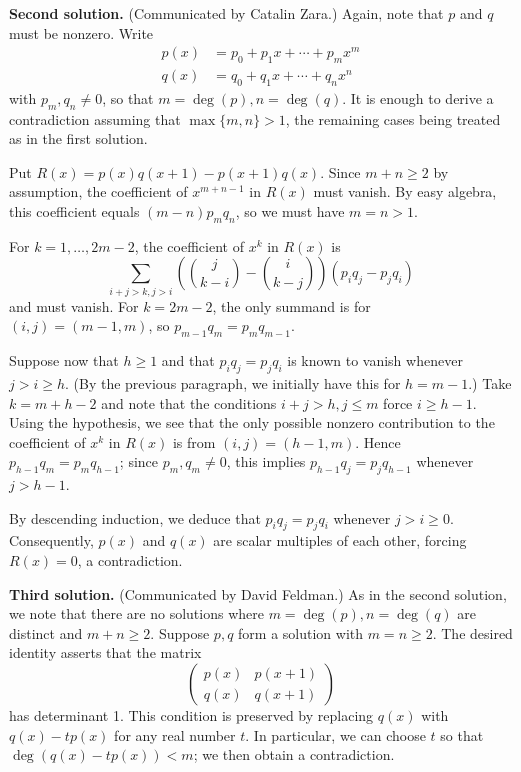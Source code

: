 \documentclass[amssymb,twocolumn,pra,10pt,aps]{revtex4-1}
\begin{document}
\begin{itemize}
\textbf{Second solution.}
(Communicated by Catalin Zara.)
Again, note that $p$ and $q$ must be nonzero.
Write
\begin{align*}
p(x) &= p_0 + p_1 x + \cdots + p_m x^m \\
q(x) &= q_0 + q_1 x + \cdots + q_n x^n
\end{align*}
with $p_m, q_n \neq 0$, so that $m = \deg(p), n = \deg(q)$. It is enough to derive a contradiction
assuming that $\max\{m,n\} > 1$, the remaining cases being treated as in the
first solution.

Put $R(x) = p(x) q(x+1) - p(x+1) q(x)$. Since $m+n \geq 2$ by assumption,
the coefficient of $x^{m+n-1}$ in $R(x)$
must vanish. By easy algebra, this coefficient equals $(m-n) p_m q_n$, so we must have $m=n > 1$.

For $k=1,\dots,2m-2$, the coefficient of $x^k$ in $R(x)$ is
\[
\sum_{i+j>k, j>i} \left( \binom{j}{k-i} - \binom{i}{k-j} \right)(p_i q_j - p_j q_i)
\]
and must vanish.
For $k=2m-2$, the only summand is for $(i,j) = (m-1,m)$, so $p_{m-1} q_m = p_m q_{m-1}$.

Suppose now that $h \geq 1$ and that $p_i q_j = p_j q_i$ is known to vanish whenever
$j>i \geq h$. (By the previous paragraph, we initially have this for $h=m-1$.)
Take $k = m+h-2$ and note that the conditions $i+j > h, j \leq m$ force $i \geq h-1$.
Using the hypothesis, we see that the only possible nonzero contribution to the coefficient of $x^k$ in $R(x)$
is from $(i,j) = (h-1,m)$. Hence $p_{h-1} q_m = p_m q_{h-1}$; since $p_m, q_m \neq 0$, this implies
$p_{h-1} q_j = p_j q_{h-1}$ whenever $j > h-1$.

By descending induction, we deduce that $p_i q_j = p_j q_i$ whenever $j>i \geq 0$. Consequently,
$p(x)$ and $q(x)$ are scalar multiples of each other, forcing $R(x) = 0$, a contradiction.

\textbf{Third solution.}
(Communicated by David Feldman.)
As in the second solution, we note that there are no solutions where $m = \deg(p), n = \deg(q)$
are distinct and $m+n \geq 2$. Suppose $p,q$ form a solution with $m = n \geq 2$.
The desired identity asserts that the matrix
\[
\begin{pmatrix}
p(x) & p(x+1) \\
q(x) & q(x+1)
\end{pmatrix}
\]
has determinant 1. This condition is preserved by replacing $q(x)$ with $q(x) - tp(x)$ for any
real number $t$. In particular, we can choose $t$ so that $\deg(q(x) - tp(x)) < m$;
we then obtain a contradiction.


\end{itemize}
\end{document}
